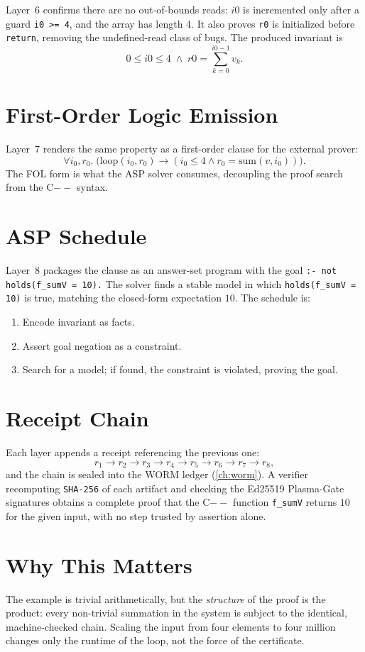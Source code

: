 Layer~6 confirms there are no out-of-bounds reads: $i0$ is incremented
only after a guard \texttt{i0 >= 4}, and the array has length 4. It also
proves \texttt{r0} is initialized before \texttt{return}, removing the
undefined-read class of bugs. The produced invariant is
\[
0 \le i0 \le 4 \;\wedge\; r0 = \sum_{k=0}^{i0-1} v_k.
\]

\section{First-Order Logic Emission}
\label{sec:work-fol}

Layer~7 renders the same property as a first-order clause for the external
prover:
\[
\forall i_0,r_0.\; \bigl(\text{loop}(i_0,r_0) \to
(i_0\le 4 \wedge r_0 = \text{sum}(v,i_0))\bigr).
\]
The FOL form is what the ASP solver consumes, decoupling the proof search
from the C$--$ syntax.

\section{ASP Schedule}
\label{sec:work-asp}

Layer~8 packages the clause as an answer-set program with the goal
\texttt{:- not holds(f\_sumV = 10).} The solver finds a stable model in
which \texttt{holds(f\_sumV = 10)} is true, matching the closed-form
expectation $10$. The schedule is:
\begin{enumerate}
  \item Encode invariant as facts.
  \item Assert goal negation as a constraint.
  \item Search for a model; if found, the constraint is violated, proving
        the goal.
\end{enumerate}

\section{Receipt Chain}
\label{sec:work-receipt}

Each layer appends a receipt referencing the previous one:
\[
r_1 \to r_2 \to r_3 \to r_4 \to r_5 \to r_6 \to r_7 \to r_8,
\]
and the chain is sealed into the WORM ledger (\cref{ch:worm}). A verifier
recomputing \texttt{SHA-256} of each artifact and checking the Ed25519
Plasma-Gate signatures obtains a complete proof that the C$--$ function
\texttt{f\_sumV} returns $10$ for the given input, with no step trusted by
assertion alone.

\section{Why This Matters}
\label{sec:work-why}

The example is trivial arithmetically, but the \emph{structure} of the
proof is the product: every non-trivial summation in the system is
subject to the identical, machine-checked chain. Scaling the input from
four elements to four million changes only the runtime of the loop, not
the force of the certificate.
